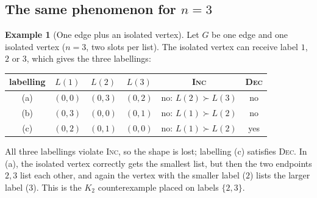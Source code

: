 \documentclass[11pt,a4paper]{article}
\theoremstyle{definition}
\newtheorem{example}[theorem]{Example}
\theoremstyle{remark}
\newcommand{\Lst}{L}
\begin{document}
\subsection{The same phenomenon for $n=3$}

\begin{example}[One edge plus an isolated vertex]\label{ex:inc3}
Let $G$ be one edge and one isolated vertex ($n=3$, two slots per list). The isolated vertex
can receive label $1$, $2$ or $3$, which gives the three labellings:

\begin{center}
\end{center}

\begin{center}
\begin{tabular}{c ccc cc}
\toprule
labelling & $\Lst(1)$ & $\Lst(2)$ & $\Lst(3)$ & \textsc{Inc} & \textsc{Dec}\\
\midrule
(a) & $(0,0)$ & $(0,3)$ & $(0,2)$ & {\color{red}no: $\Lst(2)\succ\Lst(3)$} & {\color{red}no}\\
(b) & $(0,3)$ & $(0,0)$ & $(0,1)$ & {\color{red}no: $\Lst(1)\succ\Lst(2)$} & {\color{red}no}\\
(c) & $(0,2)$ & $(0,1)$ & $(0,0)$ & {\color{red}no: $\Lst(1)\succ\Lst(2)$} & {\color{teal}yes}\\
\bottomrule
\end{tabular}
\end{center}

All three labellings violate \textsc{Inc}, so the shape is lost; labelling (c) satisfies
\textsc{Dec}. In (a), the isolated vertex correctly gets the smallest list, but then the two
endpoints $2,3$ list each other, and again the vertex with the smaller label ($2$) lists
the larger label ($3$). This is the $K_2$ counterexample placed on labels $\{2,3\}$.
\end{example}
\end{document}
